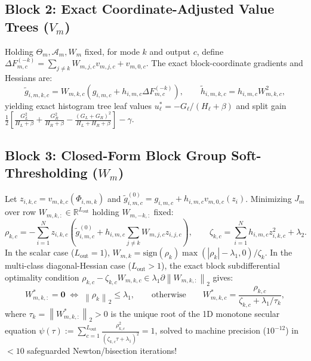\documentclass[11pt]{article}
\newcommand{\R}{\mathbb{R}}
\newcommand{\norm}[1]{\left\lVert #1 \right\rVert}
\newcommand{\abs}[1]{\left\lvert #1 \right\rvert}
\begin{document}
\subsection{Block 2: Exact Coordinate-Adjusted Value Trees ($V_m$)}
Holding $\Theta_m, \mathcal{A}_m, W_m$ fixed, for mode $k$ and output $c$, define $\Delta F_{m,c}^{(-k)} = \sum_{j \ne k} W_{m,j,c} v_{m,j,c} + v_{m,0,c}$. The exact block-coordinate gradients and Hessians are:
\begin{equation}
    \tilde{g}_{i,m,k,c} = W_{m,k,c}\!\left(g_{i,m,c} + h_{i,m,c}\Delta F_{m,c}^{(-k)}\right), \qquad \tilde{h}_{i,m,k,c} = h_{i,m,c} W_{m,k,c}^2,
\end{equation}
yielding exact histogram tree leaf values $u_\ell^* = -G_\ell / (H_\ell + \beta)$ and split gain $\frac{1}{2}[\frac{G_L^2}{H_L+\beta} + \frac{G_R^2}{H_R+\beta} - \frac{(G_L+G_R)^2}{H_L+H_R+\beta}] - \gamma$.

\subsection{Block 3: Closed-Form Block Group Soft-Thresholding ($W_m$)}
Let $z_{i,k,c} = v_{m,k,c}(\Phi_{i,m,k})$ and $\tilde{g}_{i,m,c}^{(0)} = g_{i,m,c} + h_{i,m,c} v_{m,0,c}(z_i)$. Minimizing $J_m$ over row $W_{m,k,:} \in \R^{L_{\mathrm{out}}}$ holding $W_{m,-k,:}$ fixed:
\begin{equation}
    \rho_{k,c} = -\sum_{i=1}^N z_{i,k,c}\!\left(\tilde{g}_{i,m,c}^{(0)} + h_{i,m,c}\sum_{j \ne k} W_{m,j,c} z_{i,j,c}\right), \qquad \zeta_{k,c} = \sum_{i=1}^N h_{i,m,c} z_{i,k,c}^2 + \lambda_2.
\end{equation}
In the scalar case ($L_{\mathrm{out}}=1$), $W_{m,k} = \mathrm{sign}(\rho_k)\max(\abs{\rho_k}-\lambda_1, 0)/\zeta_k$. In the multi-class diagonal-Hessian case ($L_{\mathrm{out}} > 1$), the exact block subdifferential optimality condition $\rho_{k,c} - \zeta_{k,c} W_{m,k,c} \in \lambda_1 \partial \norm{W_{m,k,:}}_2$ gives:
\begin{equation}
    W_{m,k,:}^* = \mathbf{0} \;\iff\; \norm{\rho_k}_2 \le \lambda_1, \qquad\text{otherwise}\qquad W_{m,k,c}^* = \frac{\rho_{k,c}}{\zeta_{k,c} + \lambda_1 / \tau_k},
    \label{eq:group_soft}
\end{equation}
where $\tau_k = \norm{W_{m,k,:}^*}_2 > 0$ is the unique root of the 1D monotone secular equation $\psi(\tau) := \sum_{c=1}^{L_{\mathrm{out}}} \frac{\rho_{k,c}^2}{(\zeta_{k,c}\tau + \lambda_1)^2} = 1$, solved to machine precision ($10^{-12}$) in $< 10$ safeguarded Newton/bisection iterations!
\end{document}

